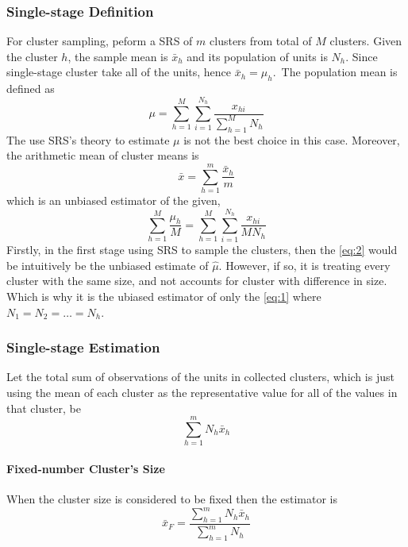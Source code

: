 \subsubsection{Single-stage Definition}
For cluster sampling, peform a SRS of $m$ clusters from total of $M$ clusters. Given the cluster $h$, the sample mean is $\bar{x}_h$ and its population of units is $N_h$. Since single-stage cluster take all of the units, hence $\bar{x}_h=\mu_h$.\
The population mean is defined as
\begin{equation}
    \mu=\sum_{h=1}^{M}\sum_{i=1}^{N_h}\frac{x_{hi}}{\sum_{h=1}^{M}N_h}
\end{equation}
The use SRS's theory to estimate $\mu$ is not the best choice in this case. Moreover, the arithmetic mean of cluster means is
\begin{equation}\label{eq:2}
    \bar{x}=\sum_{h=1}^{m}\frac{\bar{x}_h}{m}
\end{equation}
which is an unbiased estimator of the given,
\begin{equation}\label{eq:1}
    \sum_{h=1}^{M}\frac{\mu_h}{M}=\sum_{h=1}^{M}\sum_{i=1}^{N_h}\frac{x_{hi}}{MN_h} 
\end{equation}
Firstly, in the first stage using SRS to sample the clusters, then the \cref{eq:2} would be intuitively be the unbiased estimate of $\hat{\mu}$. However, if so, it is treating every cluster with the same size, and not accounts for cluster with
difference in size. Which is why it is the ubiased estimator of only the \cref{eq:1} where $N_1=N_2=\ldots=N_h$. 

\subsubsection{Single-stage Estimation}
Let the total sum of observations of the units in collected clusters, which is just using the mean of each cluster as the representative value for all of the values in that cluster, be
\begin{equation}
    \sum_{h=1}^{m}N_h\bar{x}_h
\end{equation}
\paragraph{Fixed-number Cluster's Size}
When the cluster size is considered to be fixed then the estimator is
\begin{equation}\label{eq:Fixed-NumberClusterSize}
    \bar{x}_F=\frac{\sum_{h=1}^{m}N_h\bar{x}_h}{\sum_{h=1}^{m}N_h}
\end{equation}
